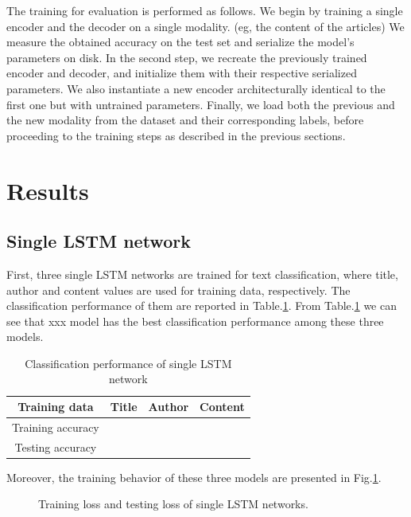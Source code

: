 \documentclass[12pt]{article}
\begin{document}
The training for evaluation is performed as follows. We begin by training a single encoder and the decoder on a single modality.
(eg, the content of the articles) We measure the obtained accuracy on the test set and serialize the model's parameters on disk. In the second step, we recreate the previously trained encoder and decoder, and initialize them with their respective serialized parameters. We also instantiate a new encoder architecturally identical to the first one but with untrained parameters. Finally, we load both the previous and the new modality from the dataset and their corresponding labels, before proceeding to the training steps as described in the previous sections.

\section{Results}\label{results}

\subsection{Single LSTM network}


First, three single LSTM networks are trained for text classification, where title, author and content values are used for training data, respectively. The classification performance of them are reported in Table.\ref{single_lstm_acc}. From Table.\ref{single_lstm_acc} we can see that xxx model has the best classification performance among these three models.

\begin{table}[!t]
\begin{center}
\caption{Classification performance of single LSTM network}
\label{single_lstm_acc}
\begin{tabular}{c|c|c|c}
\hline
Training data & Title & Author & Content\\
\hline

Training accuracy &  &  &  \\

Testing accuracy & & & \\

\hline
\end{tabular}
\end{center}
\end{table}

Moreover, the training behavior of these three models are presented in Fig.\ref{training_loss_single}.


\begin{figure}[!t]
\begin{center}
\end{center}
\caption{Training loss and testing loss of single LSTM networks.}
\label{training_loss_single}
\end{figure}
\end{document}
